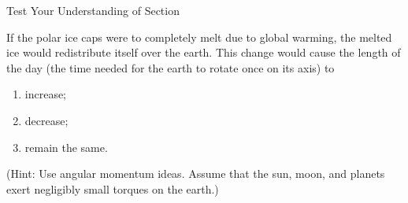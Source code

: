 \documentclass[]{beamer}
\begin{document}
  
     
  












  
  
  

  
  
  



\begin{frame}

  Test Your Understanding of Section

  \vspace{7mm}


  If the polar ice caps were to completely
melt due to global warming, the melted ice would redistribute itself over the earth.
This change would cause the length of the day (the time needed for the earth to rotate
once on its axis) to
\vspace{7mm}

\begin{enumerate}
  \item increase;
  \item decrease;
  \item remain the same.
\end{enumerate}
\vspace{7mm}

 (Hint: Use angular
momentum ideas. Assume that the sun, moon, and planets exert negligibly small torques
on the earth.)

  
  \end{frame}
\end{document}
